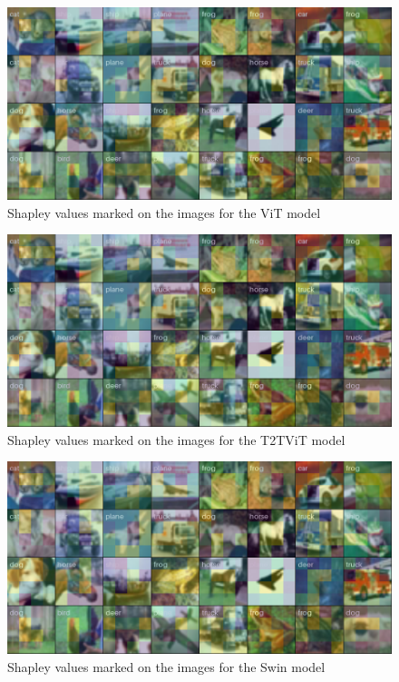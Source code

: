 \documentclass[magisterska,en]{pracamgr}
\begin{document}
\begin{figure}[H]
\centering
\includegraphics[scale=0.5]{./images/vit_shap_grid.png}
\caption{Shapley values marked on the images for the ViT model}
\label{vit_shap_grid}
\end{figure}


\begin{figure}[H]
\centering
\includegraphics[scale=0.5]{./images/t2t_vit_shap_grid.png}
\caption{Shapley values marked on the images for the T2T\textunderscore  ViT model}
\label{t2t_vit_shap_grid}
\end{figure}


\begin{figure}[H]
\centering
\includegraphics[scale=0.5]{./images/swin_shap_grid.png}
\caption{Shapley values marked on the images for the Swin model}
\label{swin_shap_grid}
\end{figure}
\end{document}
